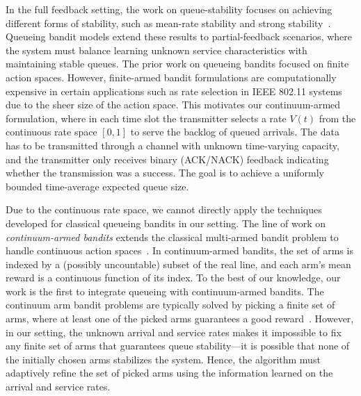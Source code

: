 \documentclass[12pt,draftcls, onecolumn]{IEEEtran}
\begin{document}
In the full feedback setting, the work on queue-stability focuses on achieving different forms of stability, such as mean-rate stability and strong stability~\cite{Neely2010coml}. Queueing bandit models extend these results to partial-feedback scenarios, where the system must balance learning unknown service characteristics with maintaining stable queues. The prior work on queueing bandits focused on finite action spaces. However, finite-armed bandit formulations are computationally expensive in certain applications such as rate selection in IEEE 802.11 systems~\cite{combes_optimal_2013} due to the sheer size of the action space. This motivates our continuum-armed formulation, where in each time slot the transmitter selects a rate $V(t)$ from the continuous rate space $[0,1]$ to serve the backlog of queued arrivals. The data has to be transmitted through a channel with unknown time-varying capacity, and the transmitter only receives binary (ACK/NACK) feedback indicating whether the transmission was a success. The goal is to achieve a uniformly bounded time-average expected queue size. 

Due to the continuous rate space, we cannot directly apply the techniques developed for classical queueing bandits in our setting. The line of work on \emph{continuum-armed bandits} extends the classical multi-armed bandit problem to handle continuous action spaces~\cite{Agrawal1995}. In continuum-armed bandits, the set of arms is indexed by a (possibly uncountable) subset of the real line, and each arm’s mean reward is a continuous function of its index.  To the best of our knowledge, our work is the first to integrate queueing with continuum-armed bandits. The continuum arm bandit problems are typically solved by picking a finite set of arms, where at least one of the picked arms guarantees a good reward~\cite{Kleinberg2003}. However, in our setting, the unknown arrival and service rates makes it impossible to fix any finite set of arms that guarantees queue stability---it is possible that none of the initially chosen arms stabilizes the system. Hence, the algorithm must adaptively refine the set of picked arms using the information learned on the arrival and service rates. 
\end{document}
